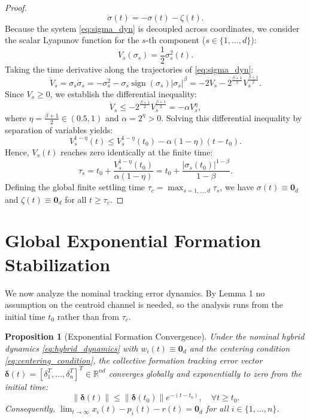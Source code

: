 \documentclass[11pt]{article}
\newtheorem{proposition}{Proposition}
\begin{document}
\begin{proof}
\begin{equation}
\dot{\sigma}(t) = -\sigma(t) - \zeta(t).
\label{eq:sigma_dyn}
\end{equation}
Because the system \eqref{eq:sigma_dyn} is decoupled across coordinates, we consider the scalar Lyapunov function for the $s$-th component ($s \in \{1, \dots, d\}$):
\begin{equation}
V_s(\sigma_s) = \frac{1}{2}\sigma_s^2(t).
\end{equation}
Taking the time derivative along the trajectories of \eqref{eq:sigma_dyn}:
\begin{equation}
\dot{V}_s = \sigma_s \dot{\sigma}_s = -\sigma_s^2 - \sigma_s \operatorname{sign}(\sigma_s)|\sigma_s|^\beta = -2V_s - 2^{\frac{\beta+1}{2}} V_s^{\frac{\beta+1}{2}}.
\end{equation}
Since $V_s \ge 0$, we establish the differential inequality:
\begin{equation}
\dot{V}_s \le -2^{\frac{\beta+1}{2}} V_s^{\frac{\beta+1}{2}} = -\alpha V_s^\eta,
\end{equation}
where $\eta = \frac{\beta+1}{2} \in (0.5, 1)$ and $\alpha = 2^\eta > 0$. Solving this differential inequality by separation of variables yields:
\begin{equation}
V_s^{1-\eta}(t) \le V_s^{1-\eta}(t_0) - \alpha(1-\eta)(t - t_0).
\end{equation}
Hence, $V_s(t)$ reaches zero identically at the finite time:
\begin{equation}
\tau_s = t_0 + \frac{V_s^{1-\eta}(t_0)}{\alpha(1-\eta)} = t_0 + \frac{|\sigma_s(t_0)|^{1-\beta}}{1-\beta}.
\label{eq:tau_c}
\end{equation}
Defining the global finite settling time $\tau_c = \max_{s=1,\dots,d} \tau_s$, we have $\sigma(t) \equiv \mathbf{0}_d$ and $\zeta(t) \equiv \mathbf{0}_d$ for all $t \ge \tau_c$.
\end{proof}

\section{Global Exponential Formation Stabilization}

We now analyze the nominal tracking error dynamics. By Lemma 1 no assumption on the centroid channel is needed, so the analysis runs from the initial time $t_0$ rather than from $\tau_c$.

\begin{proposition}[Exponential Formation Convergence]
Under the nominal hybrid dynamics \eqref{eq:hybrid_dynamics} with $w_i(t) \equiv \mathbf{0}_d$ and the centering condition \eqref{eq:centering_condition}, the collective formation tracking error vector $\boldsymbol{\delta}(t) = [\delta_1^T, \dots, \delta_n^T]^T \in \mathbb{R}^{nd}$ converges globally and exponentially to zero from the initial time:
\begin{equation}
\|\boldsymbol{\delta}(t)\| \le \|\boldsymbol{\delta}(t_0)\| e^{-(t - t_0)}, \quad \forall t \ge t_0.
\label{eq:prop2_bound}
\end{equation}
Consequently, $\lim_{t \to \infty} x_i(t) - p_i(t) - r(t) = \mathbf{0}_d$ for all $i \in \{1, \dots, n\}$.
\end{proposition}
\end{document}
